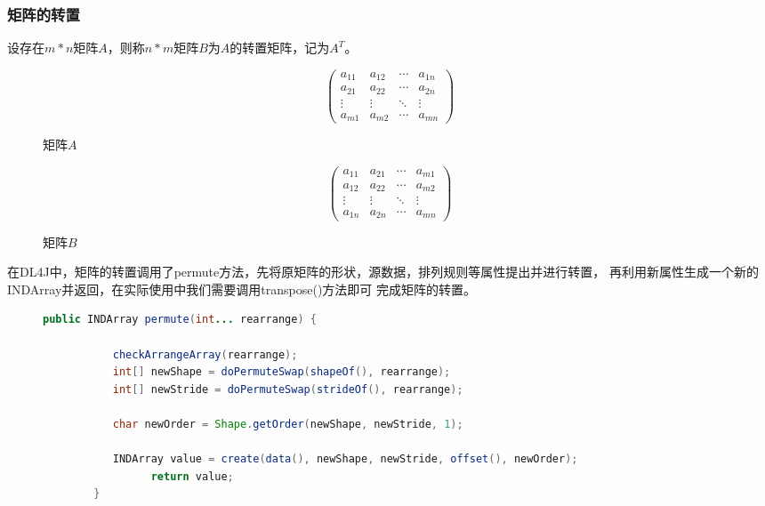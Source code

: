 \subsubsection{矩阵的转置}

设存在$m*n$矩阵$A$，则称$n*m$矩阵$B$为$A$的转置矩阵，记为$A^T$。

\begin{figure}[!hb]
	\centering
	\begin{minipage}[c]{0.5\textwidth}
	\centering
		\begin{equation}
	    \left( \begin{matrix}
        a_{11} & a_{12} & \cdots & a_{1n}\\
        a_{21} & a_{22} & \cdots & a_{2n}\\
        \vdots & \vdots & \ddots & \vdots\\
        a_{m1} & a_{m2} & \cdots & a_{mn}
        \end{matrix}
        \right )
        \end{equation}
		\caption{矩阵$A$}
	\end{minipage}%
	\begin{minipage}[c]{0.5\textwidth}
	\centering
    \begin{equation}
	    \left( \begin{matrix}
        a_{11} & a_{21} & \cdots & a_{m1}\\
        a_{12} & a_{22} & \cdots & a_{m2}\\
        \vdots & \vdots & \ddots & \vdots\\
        a_{1n} & a_{2n} & \cdots & a_{mn}
        \end{matrix}
        \right )
        \end{equation}
		\caption{矩阵$B$}
	\end{minipage}
\end{figure}

在DL4J中，矩阵的转置调用了permute方法，先将原矩阵的形状，源数据，排列规则等属性提出并进行转置，
再利用新属性生成一个新的INDArray并返回，在实际使用中我们需要调用transpose()方法即可
完成矩阵的转置。

\begin{figure}[!ht]
	\begin{lstlisting}[language=Java]
		public INDArray permute(int... rearrange) {
	
	       checkArrangeArray(rearrange);
	       int[] newShape = doPermuteSwap(shapeOf(), rearrange);
	       int[] newStride = doPermuteSwap(strideOf(), rearrange);

	       char newOrder = Shape.getOrder(newShape, newStride, 1);

	       INDArray value = create(data(), newShape, newStride, offset(), newOrder);
				 return value;
		}
	\end{lstlisting}
\end{figure}

